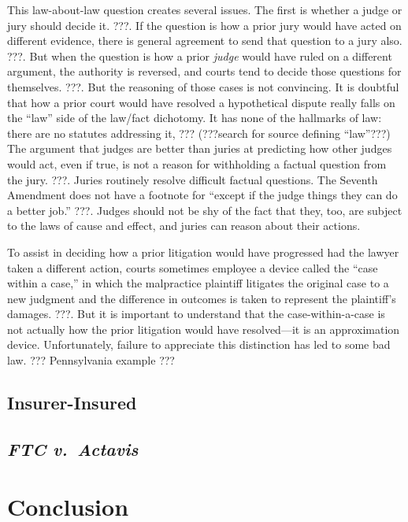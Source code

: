 \documentclass[
  12pt,
  letterpaper,
]{scrartcl}
\begin{document}
This law-about-law question creates several issues. The first is whether a
judge or jury should decide it. ???. If the question is how a prior jury would
have acted on different evidence, there is general agreement to send that
question to a jury also. ???. But when the question is how a prior \emph{judge}
would have ruled on a different argument, the authority is reversed, and courts
tend to decide those questions for themselves. ???. But the reasoning of those
cases is not convincing. It is doubtful that how a prior court would have
resolved a hypothetical dispute really falls on the ``law'' side of the
law/fact dichotomy. It has none of the hallmarks of law: there are no statutes
addressing it, ??? (???search for source defining ``law''???) The argument that
judges are better than juries at predicting how other judges would act, even if
true, is not a reason for withholding a factual question from the jury. ???.
Juries routinely resolve difficult factual questions. The Seventh Amendment
does not have a footnote for ``except if the judge things they can do a better
job.'' ???. Judges should not be shy of the fact that they, too, are subject to
the laws of cause and effect, and juries can reason about their actions.

To assist in deciding how a prior litigation would have progressed had the
lawyer taken a different action, courts sometimes employee a device called the
``case within a case,'' in which the malpractice plaintiff litigates the
original case to a new judgment and the difference in outcomes is taken to
represent the plaintiff's damages. ???. But it is important to understand that
the case-within-a-case is not actually how the prior litigation would have
resolved---it is an approximation device. Unfortunately, failure to appreciate
this distinction has led to some bad law. ??? Pennsylvania example ???

\subsection{Insurer-Insured}



\subsection{\textit{FTC v.~Actavis}}


\section{Conclusion}
\end{document}
